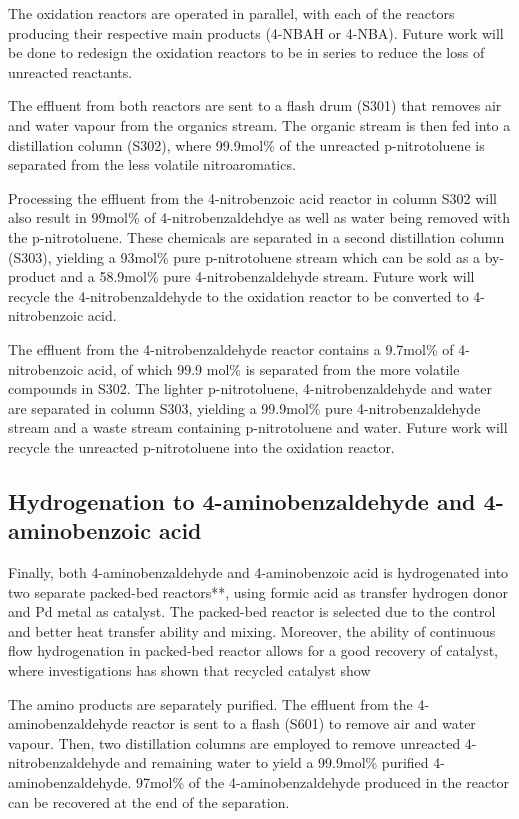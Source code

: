The oxidation reactors are operated in parallel, with each of the reactors producing their respective main products (4-NBAH or 4-NBA). Future work will be done to redesign the oxidation reactors to be in series to reduce the loss of unreacted reactants.

The effluent from both reactors are sent to a flash drum (S301) that removes air and water vapour from the organics stream. The organic stream is then fed into a distillation column (S302), where 99.9mol\% of the unreacted p-nitrotoluene is separated from the less volatile nitroaromatics. 

Processing the effluent from the 4-nitrobenzoic acid reactor in column S302 will also result in 99mol\% of 4-nitrobenzaldehdye as well as water being removed with the p-nitrotoluene. These chemicals are separated in a second distillation column (S303), yielding a 93mol\% pure p-nitrotoluene stream which can be sold as a by-product and a 58.9mol\% pure 4-nitrobenzaldehyde stream. Future work will recycle the 4-nitrobenzaldehyde to the oxidation reactor to be converted to 4-nitrobenzoic acid.

The effluent from the 4-nitrobenzaldehyde reactor contains a 9.7mol\% of 4-nitrobenzoic acid, of which 99.9 mol\% is separated from the more volatile compounds in S302. The lighter p-nitrotoluene,  4-nitrobenzaldehyde and water are separated in column S303, yielding a 99.9mol\% pure 4-nitrobenzaldehyde stream and a waste stream containing p-nitrotoluene and water. Future work will recycle the unreacted p-nitrotoluene into the oxidation reactor.

\subsection{Hydrogenation to 4-aminobenzaldehyde and 4-aminobenzoic acid}

Finally, both 4-aminobenzaldehyde and 4-aminobenzoic acid is hydrogenated into two separate packed-bed reactors**, using formic acid as transfer hydrogen donor and Pd metal as catalyst. The packed-bed reactor is selected due to the control and better heat transfer ability and mixing. Moreover, the ability of continuous flow hydrogenation in packed-bed reactor allows for a good recovery of catalyst, where investigations has shown that recycled catalyst show

The amino products are separately purified. The effluent from the 4-aminobenzaldehyde reactor is sent to a flash (S601) to remove air and water vapour.  Then, two distillation columns are employed to remove unreacted 4-nitrobenzaldehyde and remaining water to yield a 99.9mol\% purified 4-aminobenzaldehyde. 97mol\% of the 4-aminobenzaldehyde produced in the reactor can be recovered at the end of the separation.

